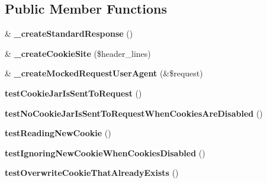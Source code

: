 \subsection*{Public Member Functions}
\begin{DoxyCompactItemize}
\item 
\hypertarget{class_test_of_browser_cookies_af26b3b20ebb0cf35c6b4caa952e05e05}{
\& {\bfseries \_\-createStandardResponse} ()}
\label{class_test_of_browser_cookies_af26b3b20ebb0cf35c6b4caa952e05e05}

\item 
\hypertarget{class_test_of_browser_cookies_a64ef0fd2ef90386e39fc3296bbde0939}{
\& {\bfseries \_\-createCookieSite} (\$header\_\-lines)}
\label{class_test_of_browser_cookies_a64ef0fd2ef90386e39fc3296bbde0939}

\item 
\hypertarget{class_test_of_browser_cookies_a87a1d21dd4dbefc893c99196bfd2a3fe}{
\& {\bfseries \_\-createMockedRequestUserAgent} (\&\$request)}
\label{class_test_of_browser_cookies_a87a1d21dd4dbefc893c99196bfd2a3fe}

\item 
\hypertarget{class_test_of_browser_cookies_ab171df6ee0d5afd65ec14f48d9901c8b}{
{\bfseries testCookieJarIsSentToRequest} ()}
\label{class_test_of_browser_cookies_ab171df6ee0d5afd65ec14f48d9901c8b}

\item 
\hypertarget{class_test_of_browser_cookies_aace3ed5bc4241e4038b85d819758d926}{
{\bfseries testNoCookieJarIsSentToRequestWhenCookiesAreDisabled} ()}
\label{class_test_of_browser_cookies_aace3ed5bc4241e4038b85d819758d926}

\item 
\hypertarget{class_test_of_browser_cookies_a01c8ccf07d5e9cfaccda0d643c298f4c}{
{\bfseries testReadingNewCookie} ()}
\label{class_test_of_browser_cookies_a01c8ccf07d5e9cfaccda0d643c298f4c}

\item 
\hypertarget{class_test_of_browser_cookies_a359ad974b261a96611c3875b4fe6c55d}{
{\bfseries testIgnoringNewCookieWhenCookiesDisabled} ()}
\label{class_test_of_browser_cookies_a359ad974b261a96611c3875b4fe6c55d}

\item 
\hypertarget{class_test_of_browser_cookies_a2aa8e918ae51ccb756382d30f5ad75fc}{
{\bfseries testOverwriteCookieThatAlreadyExists} ()}
\label{class_test_of_browser_cookies_a2aa8e918ae51ccb756382d30f5ad75fc}


\end{DoxyCompactItemize}
